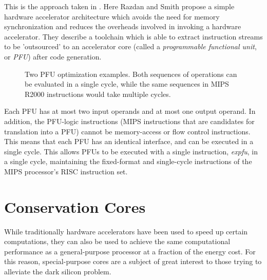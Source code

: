 \documentclass{UoYCSproject}
\begin{document}
This is the approach taken in \cite{high-performance-microarchitecture}. Here Razdan and Smith propose a simple
hardware accelerator architecture which avoids the need for memory synchronization and reduces the overheads involved in
invoking a hardware accelerator. They describe a toolchain which is able to extract instruction streams to be 'outsourced' to an
accelerator core (called a \textit{programmable functional unit}, or \textit{PFU}) after code generation.

\begin{figure}[hbt]
\caption{Two PFU optimization examples. Both sequences of operations can be evaluated in a single cycle, while the same sequences in MIPS R2000 instructions would take multiple cycles. \cite{high-performance-microarchitecture}}
\end{figure}

Each PFU has at most two input operands and at most one output operand. In addition, the PFU-logic instructions (MIPS
instructions that are candidates for translation into a PFU) cannot be memory-access or flow control instructions. This means
that each PFU has an identical interface, and can be executed in a single cycle. This allows PFUs to be executed with a single
instruction, \textit{expfu}, in a single cycle, maintaining the fixed-format and single-cycle instructions of the MIPS
processor's RISC instruction set.

\section{Conservation Cores}

While traditionally hardware accelerators have been used to speed up certain computations, they can also be used to achieve the
same computational performance as a general-purpose processor at a fraction of the energy cost. For this reason,
special-purpose cores are a subject of great interest to those trying to alleviate the dark silicon problem.
\end{document}
